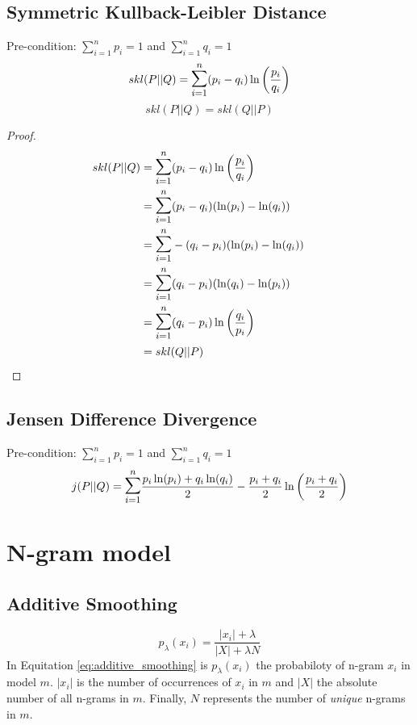 \documentclass[10pt,a4paper]{article}
\begin{document}
\subsection{Symmetric Kullback-Leibler Distance}
Pre-condition: $\sum\limits_{i=1}^n p_i = 1$ and $\sum\limits_{i=1}^n q_i = 1$
\begin{equation}
  skl(P||Q) = \mathlarger{\mathlarger{\sum}}\limits_{i=1}^n (p_i-q_i) \ln \left(\frac{p_i}{q_i}\right)
\end{equation}
\begin{equation}
  skl(P||Q) = skl(Q||P)
\end{equation}
\begin{proof}
\begin{align*}
  skl(P||Q) &= \mathlarger{\mathlarger{\sum}}\limits_{i=1}^n (p_i-q_i) \ln \left(\frac{p_i}{q_i}\right) \\
            &= \mathlarger{\mathlarger{\sum}}\limits_{i=1}^n (p_i-q_i) ( \ln(p_i) - \ln(q_i) ) \\
            &= \mathlarger{\mathlarger{\sum}}\limits_{i=1}^n -(q_i-p_i) ( \ln(p_i) - \ln(q_i) ) \\
            &= \mathlarger{\mathlarger{\sum}}\limits_{i=1}^n (q_i-p_i) ( \ln(q_i) - \ln(p_i) ) \\
            &= \mathlarger{\mathlarger{\sum}}\limits_{i=1}^n (q_i - p_i) \ln \left(\frac{q_i}{p_i}\right) \\
            &= skl(Q||P) && \qedhere
\end{align*}
\end{proof}


\subsection{Jensen Difference Divergence}
Pre-condition: $\sum\limits_{i=1}^n p_i = 1$ and $\sum\limits_{i=1}^n q_i = 1$
\begin{equation}
  j(P||Q) = \mathlarger{\mathlarger{\sum}}\limits_{i=1}^n \frac{p_i \ln(p_i) + q_i \ln(q_i)}{2} - \frac{p_i+q_i}{2} \ln\left( \frac{p_i+q_i}{2} \right)
\end{equation}

\section{N-gram model}
\subsection{Additive Smoothing}
\begin{equation}
\label{eq:additive_smoothing}
p_{\lambda}(x_i)=\frac{|x_i|+\lambda}{|X|+\lambda N}
\end{equation}
In Equitation \ref{eq:additive_smoothing} is $p_\lambda(x_i)$ the probabiloty of n-gram $x_i$ in model $m$.
$|x_i|$ is the number of occurrences of $x_i$ in $m$ and $|X|$ the absolute number of all n-grams in $m$.
Finally, $N$ represents the number of \emph{unique} n-grams in $m$.
\end{document}
